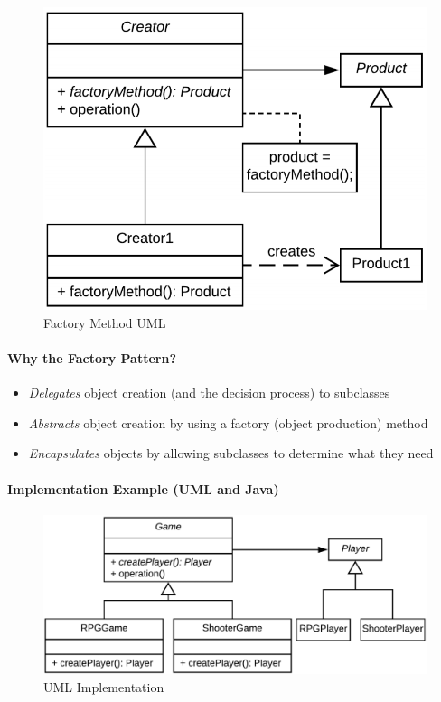 \documentclass[]{article}
\providecommand{\tightlist}{%
  \setlength{\itemsep}{0pt}\setlength{\parskip}{0pt}}
\let\oldparagraph\paragraph
\renewcommand{\paragraph}[1]{\oldparagraph{#1}\mbox{}}
\begin{document}
\begin{figure}
\centering
\includegraphics{images/factoryuml.png}
\caption{Factory Method UML}
\end{figure}

\hypertarget{why-the-factory-pattern}{%
\paragraph{Why the Factory Pattern?}\label{why-the-factory-pattern}}

\begin{itemize}
\tightlist
\item
  \emph{Delegates} object creation (and the decision process) to
  subclasses
\item
  \emph{Abstracts} object creation by using a factory (object
  production) method
\item
  \emph{Encapsulates} objects by allowing subclasses to determine what
  they need
\end{itemize}

\hypertarget{implementation-example-uml-and-java}{%
\paragraph{Implementation Example (UML and
Java)}\label{implementation-example-uml-and-java}}

\begin{figure}
\centering
\includegraphics{images/gamefactoryuml.png}
\caption{UML Implementation}
\end{figure}
\end{document}
